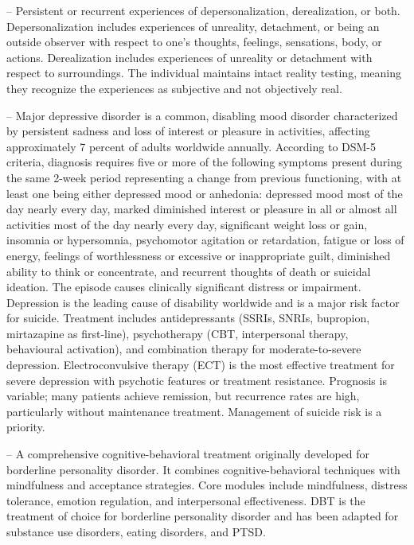 -- Persistent or recurrent experiences of depersonalization, derealization, or both. Depersonalization includes experiences of unreality, detachment, or being an outside observer with respect to one's thoughts, feelings, sensations, body, or actions. Derealization includes experiences of unreality or detachment with respect to surroundings. The individual maintains intact reality testing, meaning they recognize the experiences as subjective and not objectively real.

-- Major depressive disorder is a common, disabling mood disorder characterized by persistent sadness and loss of interest or pleasure in activities, affecting approximately 7 percent of adults worldwide annually. According to DSM-5 criteria, diagnosis requires five or more of the following symptoms present during the same 2-week period representing a change from previous functioning, with at least one being either depressed mood or anhedonia: depressed mood most of the day nearly every day, marked diminished interest or pleasure in all or almost all activities most of the day nearly every day, significant weight loss or gain, insomnia or hypersomnia, psychomotor agitation or retardation, fatigue or loss of energy, feelings of worthlessness or excessive or inappropriate guilt, diminished ability to think or concentrate, and recurrent thoughts of death or suicidal ideation. The episode causes clinically significant distress or impairment. Depression is the leading cause of disability worldwide and is a major risk factor for suicide. Treatment includes antidepressants (SSRIs, SNRIs, bupropion, mirtazapine as first-line), psychotherapy (CBT, interpersonal therapy, behavioural activation), and combination therapy for moderate-to-severe depression. Electroconvulsive therapy (ECT) is the most effective treatment for severe depression with psychotic features or treatment resistance. Prognosis is variable; many patients achieve remission, but recurrence rates are high, particularly without maintenance treatment. Management of suicide risk is a priority.

-- A comprehensive cognitive-behavioral treatment originally developed for borderline personality disorder. It combines cognitive-behavioral techniques with mindfulness and acceptance strategies. Core modules include mindfulness, distress tolerance, emotion regulation, and interpersonal effectiveness. DBT is the treatment of choice for borderline personality disorder and has been adapted for substance use disorders, eating disorders, and PTSD.

